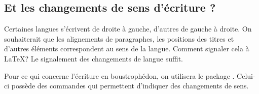 \subsection{Et les changements de sens d'écriture ?}

Certaines langues s'écrivent de droite à gauche, d'autres de gauche à droite. On souhaiterait que les alignements de paragraphes, les positions des titres et d'autres éléments correspondent au sens de la langue. 
Comment signaler cela à \LaTeX ? Le signalement des changements de langue suffit. 

\begin{plusloins}
Pour ce qui concerne l'écriture en boustrophédon, on utilisera le package . Celui-ci possède des  commandes qui permettent d'indiquer des changements de sens. 
\end{plusloins}
